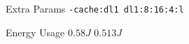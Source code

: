 
        \begin{tcolorbox}[width=\linewidth, colback=white!95!black, colframe=white!95!black]
            
            
            Extra Params \hfill \verb|-cache:dl1 dl1:8:16:4:l|

            Energy Usage \hfill \st{$0.58J$} $0.513J$

        \end{tcolorbox}
    